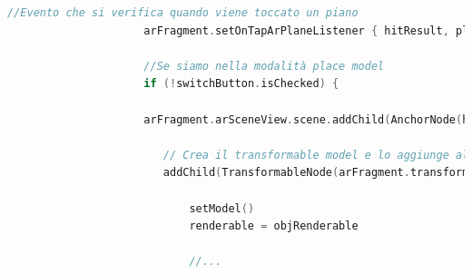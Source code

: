\documentclass[crop=false, class=book]{standalone}
\begin{document}
		\clearpage
		\begin{center}
				\begin{minipage}{1.1\textwidth}
					\begin{lstlisting}[caption={Definizione Anchor in Plane Detection}, label={lst: Definizione Anchor in Plane Detection}, language=Kotlin]
					 //Evento che si verifica quando viene toccato un piano
            		 arFragment.setOnTapArPlaneListener { hitResult, plane, motionEvent ->

                	 //Se siamo nella modalità place model
                	 if (!switchButton.isChecked) {

                     arFragment.arSceneView.scene.addChild(AnchorNode(hitResult.createAnchor()).apply {
 
                        // Crea il transformable model e lo aggiunge all'anchor
                        addChild(TransformableNode(arFragment.transformationSystem).apply {

                            setModel()
                            renderable = objRenderable
                            
                            //...
					
						\end{lstlisting}
					\end{minipage}
		\end{center}
		\vspace{0.2cm}
\end{document}
